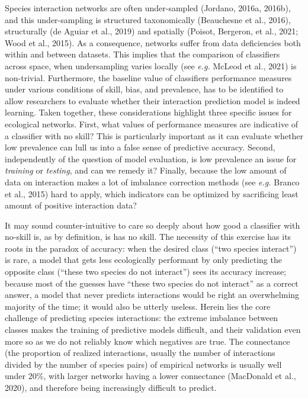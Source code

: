 \documentclass[10pt,oneside]{article}
\begin{document}
Species interaction networks are often under-sampled (Jordano, 2016a,
2016b), and this under-sampling is structured taxonomically (Beauchesne
et al., 2016), structurally (de Aguiar et al., 2019) and spatially
(Poisot, Bergeron, et al., 2021; Wood et al., 2015). As a consequence,
networks suffer from data deficiencies both within and between datasets.
This implies that the comparison of classifiers across space, when
undersampling varies locally (see \emph{e.g.} McLeod et al., 2021) is
non-trivial. Furthermore, the baseline value of classifiers performance
measures under various conditions of skill, bias, and prevalence, has to
be identified to allow researchers to evaluate whether their interaction
prediction model is indeed learning. Taken together, these
considerations highlight three specific issues for ecological networks.
First, what values of performance measures are indicative of a
classifier with no skill? This is particularly important as it can
evaluate whether low prevalence can lull us into a false sense of
predictive accuracy. Second, independently of the question of model
evaluation, is low prevalence an issue for \emph{training} or
\emph{testing}, and can we remedy it? Finally, because the low amount of
data on interaction makes a lot of imbalance correction methods (see
\emph{e.g.} Branco et al., 2015) hard to apply, which indicators can be
optimized by sacrificing least amount of positive interaction data?

It may sound counter-intuitive to care so deeply about how good a
classifier with no-skill is, as by definition, is has no skill. The
necessity of this exercise has its roots in the paradox of accuracy:
when the desired class (``two species interact'') is rare, a model that
gets less ecologically performant by only predicting the opposite class
(``these two species do not interact'') sees its accuracy increase;
because most of the guesses have ``these two species do not interact''
as a correct answer, a model that never predicts interactions would be
right an overwhelming majority of the time; it would also be utterly
useless. Herein lies the core challenge of predicting species
interactions: the extreme imbalance between classes makes the training
of predictive models difficult, and their validation even more so as we
do not reliably know which negatives are true. The connectance (the
proportion of realized interactions, usually the number of interactions
divided by the number of species pairs) of empirical networks is usually
well under 20\%, with larger networks having a lower connectance
(MacDonald et al., 2020), and therefore being increasingly difficult to
predict.
\end{document}

